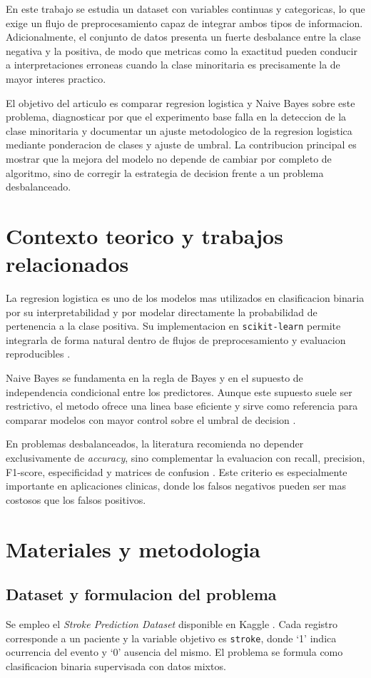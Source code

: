 \documentclass[conference]{IEEEtran}
\begin{document}
En este trabajo se estudia un dataset con variables continuas y categoricas, lo que exige un flujo de preprocesamiento capaz de integrar ambos tipos de informacion. Adicionalmente, el conjunto de datos presenta un fuerte desbalance entre la clase negativa y la positiva, de modo que metricas como la exactitud pueden conducir a interpretaciones erroneas cuando la clase minoritaria es precisamente la de mayor interes practico.

El objetivo del articulo es comparar regresion logistica y Naive Bayes sobre este problema, diagnosticar por que el experimento base falla en la deteccion de la clase minoritaria y documentar un ajuste metodologico de la regresion logistica mediante ponderacion de clases y ajuste de umbral. La contribucion principal es mostrar que la mejora del modelo no depende de cambiar por completo de algoritmo, sino de corregir la estrategia de decision frente a un problema desbalanceado.

\section{Contexto teorico y trabajos relacionados}
La regresion logistica es uno de los modelos mas utilizados en clasificacion binaria por su interpretabilidad y por modelar directamente la probabilidad de pertenencia a la clase positiva. Su implementacion en \texttt{scikit-learn} permite integrarla de forma natural dentro de flujos de preprocesamiento y evaluacion reproducibles \cite{b2}.

Naive Bayes se fundamenta en la regla de Bayes y en el supuesto de independencia condicional entre los predictores. Aunque este supuesto suele ser restrictivo, el metodo ofrece una linea base eficiente y sirve como referencia para comparar modelos con mayor control sobre el umbral de decision \cite{b3}.

En problemas desbalanceados, la literatura recomienda no depender exclusivamente de \textit{accuracy}, sino complementar la evaluacion con recall, precision, F1-score, especificidad y matrices de confusion \cite{b3}. Este criterio es especialmente importante en aplicaciones clinicas, donde los falsos negativos pueden ser mas costosos que los falsos positivos.

\section{Materiales y metodologia}
\subsection{Dataset y formulacion del problema}
Se empleo el \textit{Stroke Prediction Dataset} disponible en Kaggle \cite{b1}. Cada registro corresponde a un paciente y la variable objetivo es \texttt{stroke}, donde `1' indica ocurrencia del evento y `0' ausencia del mismo. El problema se formula como clasificacion binaria supervisada con datos mixtos.
\end{document}
